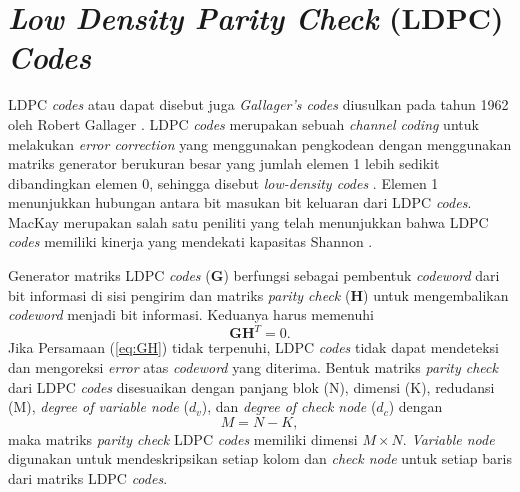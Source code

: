 \section{\textit{Low Density Parity Check} (LDPC) \textit{Codes}}
LDPC \textit{codes} atau dapat disebut juga \textit{Gallager's codes} diusulkan pada tahun 1962 oleh Robert Gallager \cite{ldpc1}. LDPC \textit{codes} merupakan sebuah \textit{channel coding} untuk melakukan \textit{error correction} yang menggunakan pengkodean dengan menggunakan matriks generator berukuran besar yang jumlah elemen 1 lebih sedikit dibandingkan elemen 0, sehingga disebut \textit{low-density codes} \cite{QC1}. Elemen 1 menunjukkan hubungan antara bit masukan  bit keluaran dari LDPC \textit{codes}. MacKay merupakan salah satu peniliti yang telah menunjukkan bahwa LDPC \textit{codes} memiliki kinerja yang mendekati kapasitas Shannon \cite{ldpc3,ldpc4,ldpc5}. 

Generator matriks LDPC \textit{codes} ($\mathbf{G}$) berfungsi sebagai pembentuk \textit{codeword} dari bit informasi di sisi pengirim dan matriks \textit{parity check} ($\mathbf{H}$) untuk mengembalikan \textit{codeword} menjadi bit informasi. Keduanya harus memenuhi 
\begin{equation}
\mathbf{G} \mathbf{H}^{T} = 0.
\label{eq:GH}
\end{equation}
Jika Persamaan (\ref{eq:GH}) tidak terpenuhi, LDPC \textit{codes} tidak dapat mendeteksi dan mengoreksi \textit{error} atas \textit{codeword} yang diterima. Bentuk matriks \textit{parity check} dari LDPC \textit{codes} disesuaikan dengan panjang blok (N), dimensi (K), redudansi (M), \textit{degree of variable node} ($d_{v}$), dan \textit{degree of check node} ($d_{c}$) dengan 
\begin{equation}
M = N-K,
\label{eq:Redudansi LDPC code}
\end{equation}
maka matriks \textit{parity check} LDPC \textit{codes} memiliki dimensi $M \times N$. \textit{Variable node} digunakan untuk mendeskripsikan setiap kolom dan \textit{check node} untuk setiap baris dari matriks LDPC \textit{codes}. 

